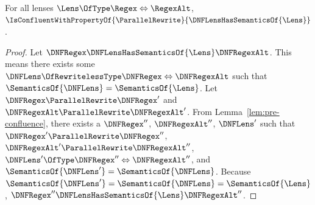 \documentclass[acmsmall,screen]{acmart}
\begin{document}
\begin{theorem}
  \label{thm:parallel_confluence_noswap}
  For all lenses $\Lens \OfType \Regex \Leftrightarrow \RegexAlt$,
  $\IsConfluentWithPropertyOf{\ParallelRewrite}{\DNFLensHasSemanticsOf{\Lens}}$.
\end{theorem}
\begin{proof}
  Let $\DNFRegex \DNFLensHasSemanticsOf{\Lens} \DNFRegexAlt$.
  This means there exists some $\DNFLens \OfRewritelessType \DNFRegex
  \Leftrightarrow \DNFRegexAlt$ such that $\SemanticsOf{\DNFLens} =
  \SemanticsOf{\Lens}$.
  Let $\DNFRegex \ParallelRewrite \DNFRegex'$ and $\DNFRegexAlt \ParallelRewrite
  \DNFRegexAlt'$.  From Lemma~\ref{lem:pre-confluence}, there exists a
  $\DNFRegex''$, $\DNFRegexAlt''$, $\DNFLens'$ such that $\DNFRegex'
  \ParallelRewrite
  \DNFRegex''$, $\DNFRegexAlt' \ParallelRewrite \DNFRegexAlt''$, $\DNFLens'
  \OfType
  \DNFRegex'' \Leftrightarrow \DNFRegexAlt''$, and $\SemanticsOf{\DNFLens'} =
  \SemanticsOf{\DNFLens}$.  Because $\SemanticsOf{\DNFLens'} =
  \SemanticsOf{\DNFLens} = \SemanticsOf{\Lens}$, $\DNFRegex''
  \DNFLensHasSemanticsOf{\Lens} \DNFRegexAlt''$.
\end{proof}
\end{document}
